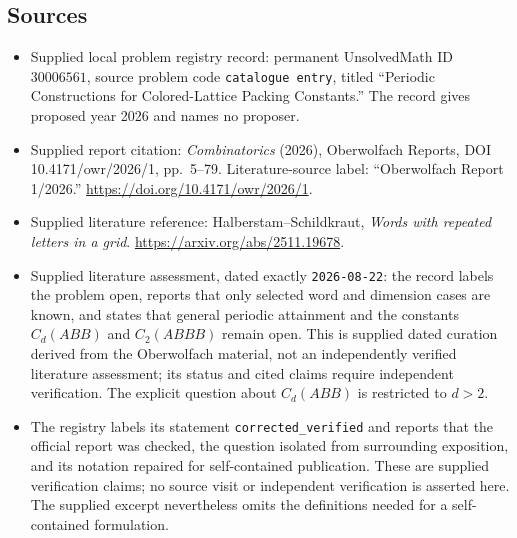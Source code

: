 \documentclass[11pt]{article}
\begin{document}
\subsection{Sources}
\begin{itemize}
\item Supplied local problem registry record: permanent UnsolvedMath ID \(30006561\), source problem code \texttt{catalogue entry}, titled ``Periodic Constructions for Colored-Lattice Packing Constants.'' The record gives proposed year 2026 and names no proposer.
\item Supplied report citation: \emph{Combinatorics} (2026), Oberwolfach Reports, DOI 10.4171/owr/2026/1, pp.\ 5--79. Literature-source label: ``Oberwolfach Report 1/2026.'' \url{https://doi.org/10.4171/owr/2026/1}.
\item Supplied literature reference: Halberstam--Schildkraut, \emph{Words with repeated letters in a grid}. \url{https://arxiv.org/abs/2511.19678}.
\item Supplied literature assessment, dated exactly \texttt{2026-08-22}: the record labels the problem open, reports that only selected word and dimension cases are known, and states that general periodic attainment and the constants \(C_d(ABB)\) and \(C_2(ABBB)\) remain open. This is supplied dated curation derived from the Oberwolfach material, not an independently verified literature assessment; its status and cited claims require independent verification. The explicit question about \(C_d(ABB)\) is restricted to \(d>2\).
\item The registry labels its statement \texttt{corrected\_verified} and reports that the official report was checked, the question isolated from surrounding exposition, and its notation repaired for self-contained publication. These are supplied verification claims; no source visit or independent verification is asserted here. The supplied excerpt nevertheless omits the definitions needed for a self-contained formulation.
\end{itemize}
\end{document}
